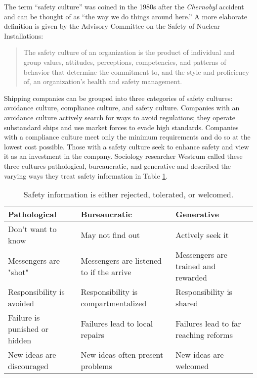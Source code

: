 \documentclass[twoside,symmetric,notoc]{tufte-book}
\begin{document}
\par{
The term ``safety culture'' was coined in the 1980s after the \textit{Chernobyl} accident and can be thought of as ``the way we do things around here.''\cite{CBI} A more elaborate definition is given by the Advisory Committee on the Safety of Nuclear Installations:\cite{HSC}
\begin{quotation}
The safety culture of an organization is the product of individual and group values, attitudes, perceptions, competencies, and patterns of behavior that determine the commitment to, and the style and proficiency of, an organization's health and safety management.
\end{quotation}
Shipping companies can be grouped into three categories of safety cultures: avoidance culture, compliance culture, and safety culture. Companies with an avoidance culture actively search for ways to avoid regulations; they operate substandard ships and use market forces to evade high standards. Companies with a compliance culture meet only the minimum requirements and do so at the lowest cost possible. Those with a safety culture seek to enhance safety and view it as an investment in the company.\cite[-0.75in]{Bhattacharya} Sociology researcher Westrum called these three cultures pathological, bureaucratic, and generative and described the varying ways they treat safety information in Table \ref{tab:culture}.\cite[-0.7in]{Elliott}\cite[-0.15in]{Westrum}
\begin{table}
\begin{tabular}{p{3cm}p{3.2cm}p{3cm}}
\hline
\textbf{Pathological}         & \textbf{Bureaucratic}                       & \textbf{Generative} \\
\hline
\hline
Don't want to know            & May not find out                            & Actively seek it \\
\hline
Messengers are "shot"         & Messengers are listened to if the arrive    & Messengers are trained and rewarded \\
\hline
Responsibility is avoided     & Responsibility is compartmentalized         & Responsibility is shared \\
\hline
Failure is punished or hidden & Failures lead to local repairs              & Failures lead to far reaching reforms \\
\hline
New ideas are discouraged     & New ideas often present problems            & New ideas are welcomed \\
\hline
\end{tabular}
\vspace{0.1in}
\caption{Safety information is either rejected, tolerated, or welcomed. }
\label{tab:culture}
\end{table}
}
\end{document}
